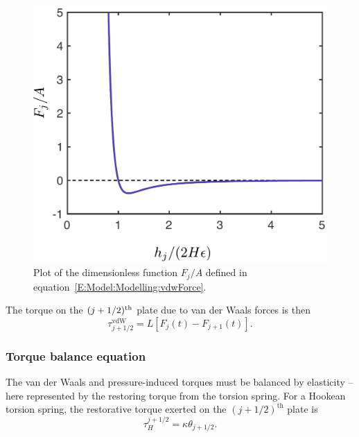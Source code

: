 \begin{figure}[t]
\centering
\includegraphics[scale=0.4]{vanderWaals}
\caption{Plot of the dimensionless function $F_j/A$ defined in equation~\eqref{E:Model:Modelling:vdwForce}. }\label{fig:Model:vanderWaals}
\end{figure}

The torque on the $(j+1/2)^{\text{th}}$ plate due to van der Waals forces is then
\begin{equation}\label{E:Model:Modelling:vdwTorque}
 \tau^{\text{vdW}}_{j+1/2} = L\left[F_j(t) - F_{j+1}(t) \right].
\end{equation}

\subsubsection{Torque balance equation}
The van der Waals and pressure-induced torques must be balanced by elasticity -- here represented by the restoring torque from the torsion spring. For a Hookean torsion spring, the restorative torque exerted on the $(j + 1/2)^\text{th}$ plate is
\begin{equation}\label{E:Model:Modelling:restorativeTorque}
\tau_{H}^{j+1/2} = \kappa \theta_{j+1/2}.
\end{equation}

